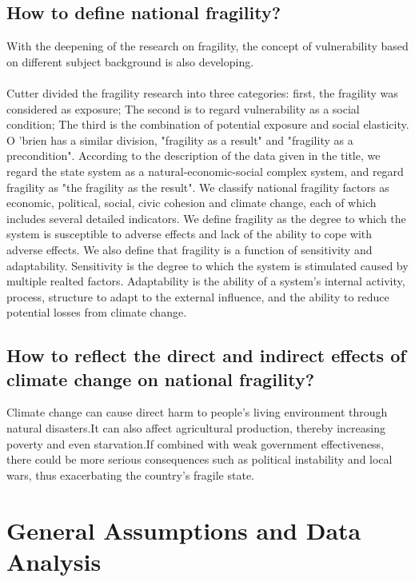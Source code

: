 \documentclass{mcmthesis}
\newcommand{\upcite}[1]{\textsuperscript{\textsuperscript{\cite{#1}}}}
\begin{document}
\subsection{How to define national fragility?}
With the deepening of the research on fragility, the concept of vulnerability 
based on different subject background is also developing.\\\\
Cutter divided the fragility research into three categories: first, the 
fragility was considered as exposure; The second is to regard vulnerability 
as a social condition; The third is the combination of potential exposure 
and social elasticity.\upcite{bib18} O 'brien has a similar division, "fragility 
as a result" and "fragility as a precondition".\upcite{bib19} According to the 
description of the data given in the title, we regard the state system as a 
natural-economic-social complex system, and regard fragility as "the fragility 
as the result". We classify national fragility factors as economic, political, 
social, civic cohesion and climate change, each of which includes several detailed 
indicators. We define fragility as the degree to which the system is susceptible 
to adverse effects and lack of the ability to cope with adverse effects. We also 
define that fragility is a function of sensitivity and adaptability. 
Sensitivity is the degree to which the system is stimulated caused by multiple 
realted factors. Adaptability is the ability of a system's internal activity, 
process, structure to adapt to the external influence, and the ability to reduce 
potential losses from climate change.
\subsection{How to reflect the direct and indirect effects of climate change on national fragility?}
Climate change can cause direct harm to people's living environment through natural 
disasters.It can also affect agricultural production, thereby increasing 
poverty and even starvation.If combined with weak government effectiveness, 
there could be more serious consequences such as political instability and 
local wars, thus exacerbating the country's fragile state.
\section{General Assumptions and Data Analysis}
\end{document}
